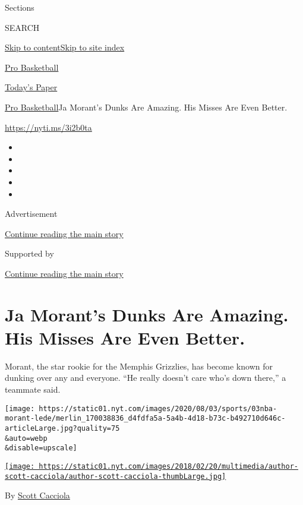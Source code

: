 Sections

SEARCH

\protect\hyperlink{site-content}{Skip to
content}\protect\hyperlink{site-index}{Skip to site index}

\href{https://www.nytimes.com/section/sports/basketball}{Pro Basketball}

\href{https://myaccount.nytimes.com/auth/login?response_type=cookie\&client_id=vi}{}

\href{https://www.nytimes.com/section/todayspaper}{Today's Paper}

\href{/section/sports/basketball}{Pro Basketball}\textbar{}Ja Morant's
Dunks Are Amazing. His Misses Are Even Better.

\url{https://nyti.ms/3i2b0ta}

\begin{itemize}
\item
\item
\item
\item
\item
\end{itemize}

Advertisement

\protect\hyperlink{after-top}{Continue reading the main story}

Supported by

\protect\hyperlink{after-sponsor}{Continue reading the main story}

\hypertarget{ja-morants-dunks-are-amazing-his-misses-are-even-better}{%
\section{Ja Morant's Dunks Are Amazing. His Misses Are Even
Better.}\label{ja-morants-dunks-are-amazing-his-misses-are-even-better}}

Morant, the star rookie for the Memphis Grizzlies, has become known for
dunking over any and everyone. ``He really doesn't care who's down
there,'' a teammate said.

\texttt{[image: https://static01.nyt.com/images/2020/08/03/sports/03nba-morant-lede/merlin\_170038836\_d4fdfa5a-5a4b-4d18-b73c-b492710d646c-articleLarge.jpg?quality=75\\\&auto=webp\\\&disable=upscale]}

\href{https://www.nytimes.com/by/scott-cacciola}{\texttt{[image: https://static01.nyt.com/images/2018/02/20/multimedia/author-scott-cacciola/author-scott-cacciola-thumbLarge.jpg]}}

By \href{https://www.nytimes.com/by/scott-cacciola}{Scott Cacciola}

